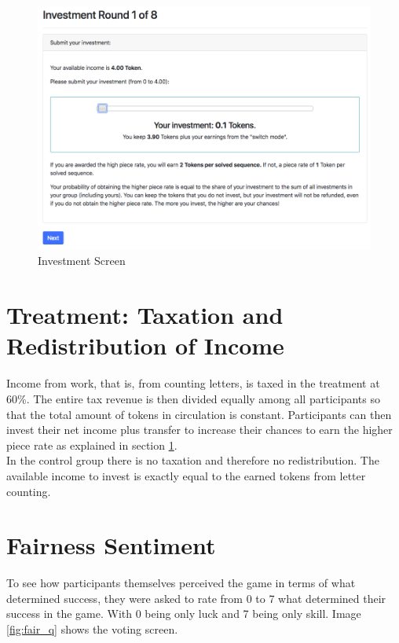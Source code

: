     \begin{figure}
        \centering
        \includegraphics[width=\textwidth]{graphs/screen_invest.png}
        \caption{Investment Screen}
        \label{fig:screen_invest}
    \end{figure}
    
    
    \section{Treatment: Taxation and Redistribution of Income}
    \label{ss:treat}
    
    Income from work, that is, from counting letters, is taxed in the treatment at 60\%. The entire tax revenue is then divided equally among all participants so that the total amount of tokens in circulation is constant. Participants can then invest their net income plus transfer to increase their chances to earn the higher piece rate as explained in section \ref{ss:treat}.\\
    
    In the control group there is no taxation and therefore no redistribution. The available income to invest is exactly equal to the earned tokens from letter counting.
    
    \section{Fairness Sentiment}
    
    To see how participants themselves perceived the game in terms of what determined success, they were asked to rate from 0 to 7 what determined their success in the game. With 0 being only luck and 7 being only skill. Image \ref{fig:fair_q} shows the voting screen.\\
    
